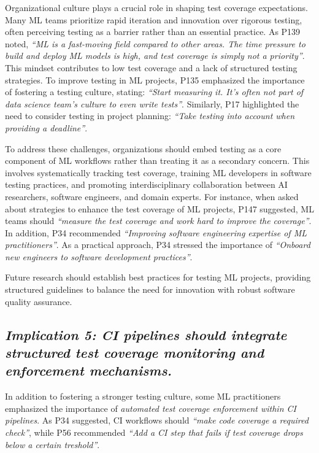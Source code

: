 Organizational culture plays a crucial role in shaping test coverage expectations.
Many ML teams prioritize rapid iteration and innovation over rigorous testing, often perceiving testing as a barrier rather than an essential practice. 
As P139 noted, \textit{``ML is a fast-moving field compared to other areas. The time pressure to build and deploy ML models is high, and test coverage is simply not a priority''}.
This mindset contributes to low test coverage and a lack of structured testing strategies. To improve testing in ML projects, P135 emphasized the importance of fostering a testing culture, stating: \textit{``Start measuring it. It’s often not part of data science team’s culture to even write tests''}. Similarly, P17 highlighted the need to consider testing in project planning: \textit{``Take testing into account when providing a deadline''}.

To address these challenges, organizations should embed testing as a core component of ML workflows rather than treating it as a secondary concern. 
This involves systematically tracking test coverage, training ML developers in software testing practices, and promoting interdisciplinary collaboration between AI researchers, software engineers, and domain experts. 
For instance, when asked about strategies to enhance the test coverage of ML projects, 
P147 suggested, ML teams should \textit{``measure the test coverage and work hard to improve the coverage''}. 
In addition, P34 recommended \textit{``Improving software engineering expertise of ML practitioners''}. 
As a practical approach, P34 stressed the importance of \textit{``Onboard new engineers to software development practices''}.

Future research should establish best practices for testing ML projects, providing structured guidelines to balance the need for innovation with robust software quality assurance. 

\subsection*{\textbf{\textit{Implication 5: CI pipelines should integrate structured test coverage monitoring and enforcement mechanisms.}}}

In addition to fostering a stronger testing culture, some ML practitioners emphasized the importance of \textit{automated test coverage enforcement within CI pipelines}. As P34 suggested, CI workflows should \textit{``make code coverage a required check''}, while P56 recommended \textit{``Add a CI step that fails if test coverage drops below a certain treshold''}. 


